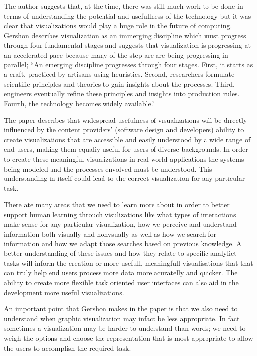 \documentclass{sig-alternate}
\begin{document}
The author suggests that, at the time, there was still much work to be done
in terms of understanding the potential and usefullness of the technology but it
was clear that visualizations would play a huge role in the future of computing.
Gershon describes visualization as an immerging discipline which must progress
through four fundamental stages and suggests that visualization is progressing
at an accelerated pace because many of the step are are being progressing in
parallel; ``An emerging discipline progresses through four stages. First, it
starts as a craft, practiced by artisans using heuristics. Second, researchers
formulate scientific principles and theories to gain insights about the
processes. Third, engineers eventually refine these principles and insights
into production rules. Fourth, the technology becomes widely available.''

The paper describes that widespread usefulness of visualizations will be
directly influenced by the content providers' (software design and developers)
ability to create visualizations that are accessible and easily understood by
a wide range of end users, making them equaliy useful for users of diverse
backgrounds. In order to create these meaningful visualizations in real world
applications the systems being modeled and the processes envolved must be
understood. This understanding in itself could lead to the correct visualization
for any particular task. 

There ate many areas that we need to learn more about in order to better
support human learning throuch visulizations like what types of interactions
make sense for any particular visualization, how we perceive and
understand information both visually and nonvsually as well as how we search
for information and how we adapt those searches based on previous knowledge. A
better understanding of these issues and how they relate to specific analylict 
tasks will inform the creation or more usefull, meaningfull visualisations that 
that can truly help end users process more data more acuratelly and quicker. The
ability to create more flexible task oriented user interfaces can also aid in
the development more useful visualizations.

An important point that Gershon makes in the paper is that we also need to
understand when graphic visualization may infact be less appropriate. In fact
sometimes a visualization may be harder to understand than words; we need to
weigh the options and choose the representation that is most appropriate to
allow the users to accomplish the required task.
\end{document}
